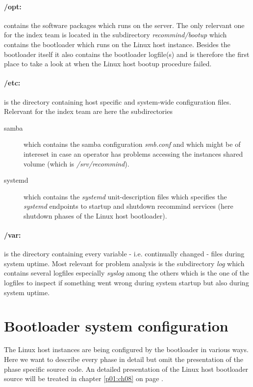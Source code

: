 	\paragraph{/opt:} contains the software packages which runs on the server. The only relervant one for the index team is located in the subdirectory \emph{recommind/bootup} which contains the bootloader which runs on the Linux host instance. Besides the bootloader itself it also contains the bootloader logfile(s) and is therefore the first place to take a look at when the Linux host bootup procedure failed.
	
	\paragraph{/etc:} is the directory containing host specific and system-wide configuration files. Relervant for the index team are here the subdirectories
	\begin{description}
		\item[samba] which contains the samba configuration \emph{smb.conf} and which might be of intereset in case an operator has problems accessing the instances shared volume (which is \emph{/srv/recommind}).
		\item[systemd] which contains the \emph{systemd} unit-description files which specifies the \emph{systemd} endpoints to startup and shutdown recommind services (here shutdown phases of the Linux host bootloader).
	\end{description}
	
	\paragraph{/var:} is the directory containing every variable - i.e. continually changed - files during system uptime. Most relevant for problem analysis is the subdirectory \emph{log} which contains several logfiles especially \emph{syslog} among the others which is the one of the logfiles to inspect if something went wrong during system startup but also during system uptime.
	
	\section{Bootloader system configuration}
	The Linux host instances are being configured by the bootloader in various ways. Here we want to describe every phase in detail but omit the presentation of the phase specific source code. An detailed presentation of the Linux host bootloader source will be treated in chapter \ref{p01:ch08} on page \pageref{p01:ch08}.
	
